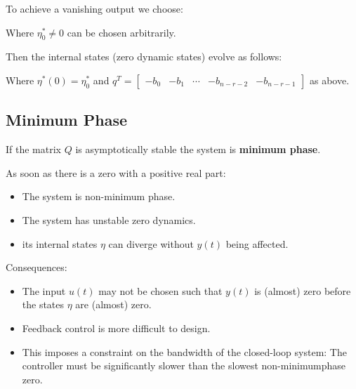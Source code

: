\documentclass[10pt,a4paper]{scrartcl}
\begin{document}
\begin{multicols*}{3}
To achieve a vanishing output we choose:


Where $\eta_0^\ast\neq 0$ can be chosen arbitrarily.

Then the internal states (zero dynamic states) evolve as follows:


Where $\eta^\ast(0)=\eta_0^\ast$ and $q^T=\begin{bmatrix}-b_0&-b_1&\cdots&-b_{n-r-2}&-b_{n-r-1}\end{bmatrix}$ as above.

\vfill
\null
\newpage

\subsection{Minimum Phase}

If the matrix $Q$ is asymptotically stable the system is \textbf{minimum phase}.

As soon as there is a zero with a positive real part:

\begin{itemize}
\ncompaq
\item The system is non-minimum phase.
\item The system has unstable zero dynamics.
\item its internal states $\eta$ can diverge without $y(t)$ being affected.
\end{itemize}

Consequences:

\begin{itemize}
\ncompaq
\item The input $u(t)$ may not be chosen such that $y(t)$ is (almost) zero before the states $\eta$ are (almost) zero.
\item Feedback control is more difficult to design.
\item This imposes a constraint on the bandwidth of the closed-loop system: The controller must be significantly slower than the slowest non-minimumphase zero.
\end{itemize}


\end{multicols*}
\end{document}
